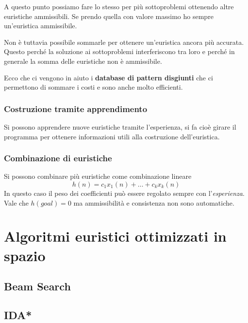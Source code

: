 A questo punto possiamo fare lo stesso per pi\`u sottoproblemi ottenendo altre euristiche
ammissibili. Se prendo quella con valore massimo ho sempre un'euristica ammissibile.

Non \`e tuttavia possibile sommarle per ottenere un'euristica ancora pi\`u accurata. Questo
perch\'e la soluzione ai sottoproblemi interferiscono tra loro e perch\'e in generale la somma
delle euristiche non \`e ammissibile.

Ecco che ci vengono in aiuto i \textbf{database di pattern disgiunti} che ci permettono di
sommare i costi e sono anche molto efficienti.

\subsubsection{Costruzione tramite apprendimento}
Si possono apprendere nuove euristiche tramite l'esperienza, si fa cio\`e girare il programma
per ottenere informazioni utili alla costruzione dell'euristica.

\subsubsection{Combinazione di euristiche}
Si possono combinare pi\`u euristiche come combinazione lineare
\[ h(n) = c_1 x_1(n) + \dots + c_k x_k(n) \]
In questo caso il peso dei coefficienti pu\`o essere regolato sempre con l'\emph{esperienza}.
Vale che $h(goal) = 0$ ma ammissibilit\`a e consistenza non sono automatiche.

\section{Algoritmi euristici ottimizzati in spazio}
\subsection{Beam Search}
\subsection{IDA*}